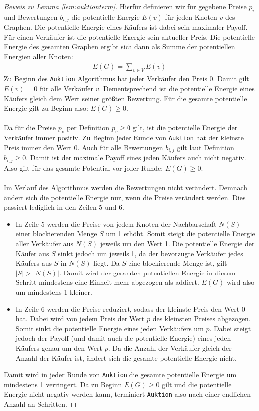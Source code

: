 \documentclass[a4paper]{scrreprt}
\theoremstyle{plain} %
\theoremstyle{definition} %
\begin{document}
\begin{proof}[Beweis zu Lemma \ref{lem:auktionterm}]
Hierfür definieren wir für gegebene Preise $p_i$ und Bewertungen $b_{i,j}$ die potentielle Energie $E(v)$ für jeden Knoten $v$ des Graphen. Die potentielle
Energie eines Käufers ist dabei sein maximaler Payoff.
Für einen Verkäufer ist die potentielle Energie sein aktueller Preis. Die potentielle
Energie des gesamten Graphen ergibt sich dann als Summe der potentiellen Energien aller Knoten: 
\begin{align*}
E(G) = \sum_{v\in V} E(v)
\end{align*}
Zu Beginn des \texttt{Auktion} Algorithmus hat jeder Verkäufer den
Preis 0. Damit gilt $E (v) = 0$ für alle Verkäufer $v$. Dementsprechend ist die potentielle
Energie eines Käufers gleich dem Wert seiner größten Bewertung. Für die gesamte potentielle Energie
gilt zu Beginn also: $E(G) \ge 0$.
\\
\\
Da für die Preise $p_v$ per Definition $p_v \ge 0$ gilt, ist die potentielle Energie der Verkäufer immer
positiv. Zu Beginn jeder Runde von \texttt{Auktion} hat der kleinste Preis immer den Wert 0. Auch für alle
Bewertungen $b_{i,j}$ gilt laut Definition $b_{i,j} \ge 0$. Damit ist der maximale Payoff eines jeden Käufers
auch nicht negativ. Also gilt für das gesamte Potential vor jeder Runde:
$E(G)\ge 0$.
\\
\\
Im Verlauf des Algorithmus werden die Bewertungen nicht verändert. Demnach ändert sich die potentielle Energie nur,
wenn die Preise verändert werden. Dies passiert lediglich in den Zeilen 5 und 6.
\begin{itemize}
\item
In Zeile 5 werden die Preise von jedem Knoten der Nachbarschaft $N(S)$ einer blockierenden Menge $S$ um 1 erhöht.
Somit steigt die potentielle Energie aller Verkäufer aus $N(S)$ jeweils um den Wert 1. Die 
potentielle Energie der Käufer aus $S$ sinkt jedoch um jeweils 1, da der bevorzugte Verkäufer jedes Käufers aus
$S$ in $N(S)$ liegt. Da $S$ eine blockierende Menge ist, gilt $|S| > |N(S)|$. Damit
wird der gesamten potentiellen Energie in diesem Schritt mindestens eine Einheit mehr abgezogen als addiert.
$E(G)$ wird also um mindestens 1 kleiner. 
\item
In Zeile 6 werden die Preise reduziert, sodass der kleinste Preis den Wert 0 hat. Dabei wird
von jedem Preis der Wert $p$ des kleinsten Preises abgezogen. Somit sinkt die potentielle Energie eines
jeden Verkäufers um $p$. Dabei steigt jedoch der Payoff (und damit auch die potentielle Energie)
eines jeden Käufers genau um den Wert $p$.
Da die Anzahl der Verkäufer gleich der Anzahl der Käufer ist, ändert sich die gesamte potentielle Energie nicht.
\end{itemize}

\noindent
Damit wird in jeder Runde von \texttt{Auktion} die gesamte potentielle Energie um mindestens 1 verringert.
Da zu Beginn $E(G) \ge 0$ gilt und die potentielle Energie nicht negativ werden kann, 
terminiert \texttt{Auktion} also nach einer endlichen Anzahl an Schritten.
\end{proof}
\end{document}
